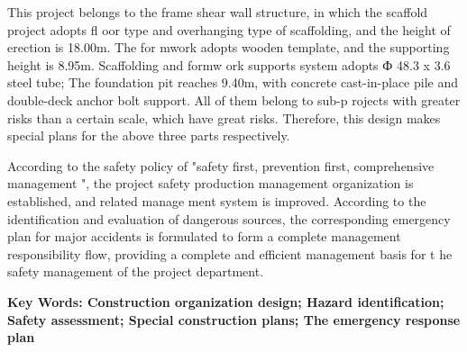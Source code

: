    This project belongs to the frame shear wall structure, in which the scaffold project adopts fl oor type and overhanging type of scaffolding, 
   and the height of erection is 18.00m. The for mwork adopts wooden template, and the supporting height is 8.95m. Scaffolding and formw ork 
   supports system adopts Ф 48.3 x 3.6 steel tube; The foundation pit reaches 9.40m, with concrete cast-in-place pile and double-deck anchor 
   bolt support. All of them belong to sub-p rojects with greater risks than a certain scale, which have great risks. Therefore, this design 
   makes special plans for the above three parts respectively.

   According to the safety policy of "safety first, prevention first, comprehensive management ", the project safety production management 
   organization is established, and related manage ment system is improved. According to the identification and evaluation of dangerous sources,
    the corresponding emergency plan for major accidents is formulated to form a complete management responsibility flow, providing a complete 
    and efficient management basis for t he safety management of the project department.


\textbf{ Key Words: Construction organization design; Hazard identification; Safety assessment; Special construction plans; The emergency response plan}
\pagestyle{fancy}




